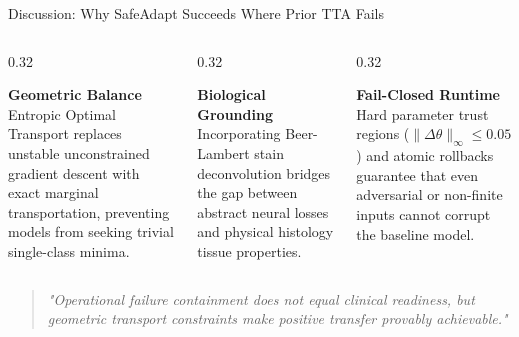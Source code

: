 \documentclass[aspectratio=169,10pt]{beamer}
\begin{document}
\begin{frame}{Discussion: Why SafeAdapt Succeeds Where Prior TTA Fails}
    \begin{columns}[T]
        \begin{column}{0.32\textwidth}
            \begin{block}{\textbf{Geometric Balance}}
                \small
                Entropic Optimal Transport replaces unstable unconstrained gradient descent with exact marginal transportation, preventing models from seeking trivial single-class minima.
            \end{block}
        \end{column}
        \begin{column}{0.32\textwidth}
            \begin{block}{\textbf{Biological Grounding}}
                \small
                Incorporating Beer-Lambert stain deconvolution bridges the gap between abstract neural losses and physical histology tissue properties.
            \end{block}
        \end{column}
        \begin{column}{0.32\textwidth}
            \begin{block}{\textbf{Fail-Closed Runtime}}
                \small
                Hard parameter trust regions ($\|\Delta\theta\|_\infty \le 0.05$) and atomic rollbacks guarantee that even adversarial or non-finite inputs cannot corrupt the baseline model.
            \end{block}
        \end{column}
    \end{columns}
    \vspace{0.4cm}
    \begin{quote}
        \centering\small
        \textit{"Operational failure containment does not equal clinical readiness, but geometric transport constraints make positive transfer provably achievable."}
    \end{quote}
\end{frame}
\end{document}
